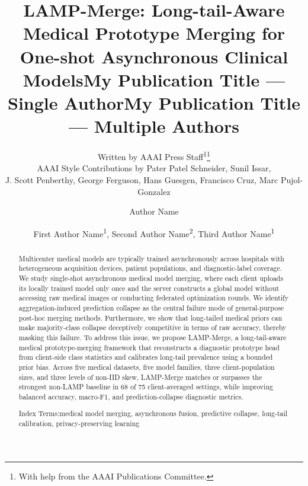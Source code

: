 \documentclass[letterpaper]{article} %
\title{LAMP-Merge: Long-tail-Aware Medical Prototype Merging for One-shot Asynchronous Clinical Models}
\author{
    Written by AAAI Press Staff\textsuperscript{\rm 1}\thanks{With help from the AAAI Publications Committee.}\\
    AAAI Style Contributions by Pater Patel Schneider,
    Sunil Issar,\\
    J. Scott Penberthy,
    George Ferguson,
    Hans Guesgen,
    Francisco Cruz\equalcontrib,
    Marc Pujol-Gonzalez\equalcontrib
}
\title{My Publication Title --- Single Author}
\author {
    Author Name
}
\title{My Publication Title --- Multiple Authors}
\author {
    First Author Name\textsuperscript{\rm 1},
    Second Author Name\textsuperscript{\rm 2},
    Third Author Name\textsuperscript{\rm 1}
}
\begin{document}
\maketitle

\begin{abstract}
%
Multicenter medical models are typically trained asynchronously across hospitals with heterogeneous acquisition devices, patient populations, and diagnostic-label coverage. We study single-shot asynchronous medical model merging, where each client uploads its locally trained model only once and the server constructs a global model without accessing raw medical images or conducting federated optimization rounds. We identify aggregation-induced prediction collapse as the central failure mode of general-purpose post-hoc merging methods. Furthermore, we show that long-tailed medical priors can make majority-class collapse deceptively competitive in terms of raw accuracy, thereby masking this failure. To address this issue, we propose LAMP-Merge, a long-tail-aware medical prototype-merging framework that reconstructs a diagnostic prototype head from client-side class statistics and calibrates long-tail prevalence using a bounded prior bias. Across five medical datasets, five model families, three client-population sizes, and three levels of non-IID skew, LAMP-Merge matches or surpasses the strongest non-LAMP baseline in 68 of 75 client-averaged settings, while improving balanced accuracy, macro-F1, and prediction-collapse diagnostic metrics.

Index Terms:medical model merging, asynchronous fusion, predictive collapse, long-tail calibration, privacy-preserving learning
\end{abstract}


\end{document}
